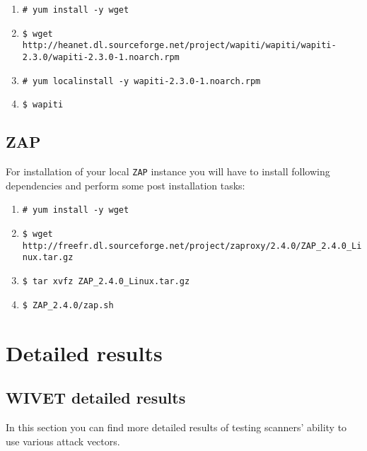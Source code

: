 			\begin{enumerate}
		\item \texttt{\# yum install -y wget}
		\item \texttt{\$ wget http://heanet.dl.sourceforge.net/project/wapiti/wapiti/wapiti-2.3.0/wapiti-2.3.0-1.noarch.rpm }
		\item \texttt{\# yum localinstall -y wapiti-2.3.0-1.noarch.rpm}				
		\item \texttt{\$ wapiti}	
			\end{enumerate}
	
	\section{ZAP}\label{app:installation-of-zap}
	
	For installation of your local \texttt{ZAP} instance you will have to install following dependencies and perform some post installation tasks:
	
			\begin{enumerate}
				\item \texttt{\# yum install -y wget}
				\item \texttt{\$ wget http://freefr.dl.sourceforge.net/project/zaproxy/2.4.0/ZAP\_2.4.0\_Linux.tar.gz}
				\item \texttt{\$ tar xvfz ZAP\_2.4.0\_Linux.tar.gz}
				\item \texttt{\$ ZAP\_2.4.0/zap.sh}
			\end{enumerate}
	
\chapter{Detailed results}\label{app:detailedResults}

	\section{WIVET detailed results}\label{app:detailedResultsWIVET}
	
	In this section you can find more detailed results of testing scanners' ability to use various attack vectors.


